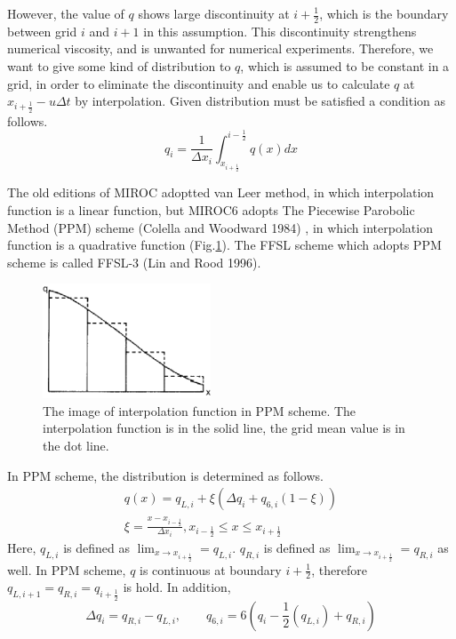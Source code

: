 However, the value of $q$ shows large discontinuity at $i+\frac{1}{2}$, which is the boundary between grid $i$ and $i+1$ in this assumption.
This discontinuity strengthens numerical viscosity, and is unwanted for numerical experiments. 
Therefore, we want to give some kind of distribution to $q$, which is assumed to be constant in a grid, in order to eliminate the discontinuity and enable us to calculate $q$ at $x_{i+\frac{1}{2}}-u\Delta t$ by interpolation.
Given distribution must be satisfied a condition as follows.
\begin{equation}
  q_{i}=\frac{1}{\Delta x_{i}} \int_{x_{i+\frac{1}{2}}}^{i-\frac{1}{2}} q(x) dx
\end{equation}

The old editions of MIROC adoptted van Leer method, in which interpolation function is a linear function, but MIROC6 adopts The Piecewise Parobolic Method (PPM) scheme (Colella and Woodward 1984) , in which interpolation function is a quadrative function (Fig.\ref{f1}). The FFSL scheme which adopts PPM scheme is called FFSL-3 (Lin and Rood 1996).

\begin{figure}
  \centering
  \includegraphics[width=5cm]{ppm_interpolate.png}
  \caption{The image of interpolation function in PPM scheme. The interpolation function is in the solid line, the grid mean value is in the dot line.}
  \label{f1}
\end{figure}

In PPM scheme, the distribution is determined as follows.
\begin{equation}
\begin{split}
\label{a4}
  q(x)=q_{L,i}+\xi (\Delta q_{i}+q_{6,i}(1-\xi))\\
  \xi=\frac{x-x_{i-\frac{1}{2}}}{\Delta x_{i}},  x_{i-\frac{1}{2}}\leq x \leq x_{i+\frac{1}{2}}
  \end{split}
\end{equation}
Here, $q_{L,i}$ is defined as $\lim_{x \to x_{i+\frac{1}{2}}}=q_{L,i}$.
$q_{R,i}$ is defined as $\lim_{x \to x_{i+\frac{1}{2}}}=q_{R,i}$ as well.
In PPM scheme, $q$ is continuous at boundary $i+\frac{1}{2}$, therefore $q_{L,i+1}=q_{R,i}=q_{i+\frac{1}{2}}$ is hold.
In addition, 
\begin{equation}
  \Delta q_{i}=q_{R,i}-q_{L,i},\qquad q_{6,i}=6(q_{i}-\frac{1}{2}(q_{L,i})+q_{R,i})
\end{equation}


